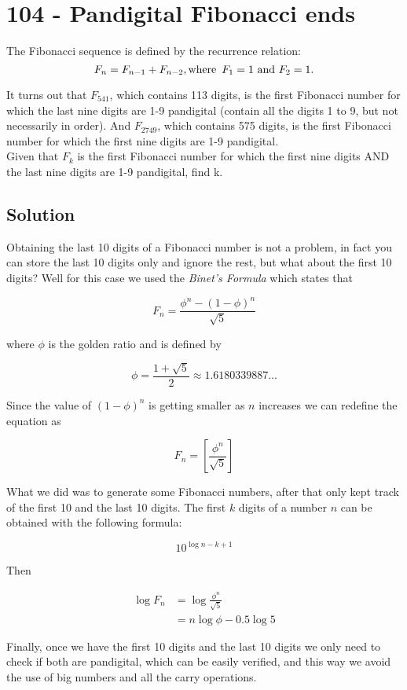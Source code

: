 \chapter*{104 - Pandigital Fibonacci ends}

 

The Fibonacci sequence is defined by the recurrence relation:\\

$$
F_n = F_{n-1} + F_{n-2}, \mbox{where} \hphantom{4} F_1 = 1 \mbox{ and } F_2 = 1.
$$

It turns out that $F_{541}$, which contains 113 digits, is the first Fibonacci number for which the last nine digits are 1-9 pandigital (contain all the digits 1 to 9, but not necessarily in order). And $F_{2749}$, which contains 575 digits, is the first Fibonacci number for which the first nine digits are 1-9 pandigital.\\

Given that $F_k$ is the first Fibonacci number for which the first nine digits AND the last nine digits are 1-9 pandigital, find k.

\section*{Solution}

Obtaining the last 10 digits of a Fibonacci number is not a problem, in fact you can store the last 10 digits only and ignore the rest, but what about the first 10 digits? Well for this case we used the \textit{Binet's Formula} which states that

$$
F_n = \frac{\phi^n - (1 - \phi)^{n}}{\sqrt{5}}
$$

where $\phi$ is the golden ratio and is defined by

$$
\phi = \frac{1 + \sqrt{5}}{2} \approx 1.6180339887 \ldots
$$

Since the value of $(1 - \phi)^n$ is getting smaller as $n$ increases we can redefine the equation as

$$
F_n = \left [ \frac{\phi^n}{\sqrt{5}} \right ]
$$

What we did was to generate some Fibonacci numbers, after that only kept track of the first 10 and the last 10 digits. The first $k$ digits of a number $n$ can be obtained with the following formula:

$$
10^{\log{n} - k + 1}
$$

Then

\begin{align*}
    \log{F_n} &= \log{\frac{\phi^n}{\sqrt{5}}} \\ 
    &= n \log{\phi} - 0.5\log{5}
\end{align*}

Finally, once we have the first 10 digits and the last 10 digits we only need to check if both are pandigital, which can be easily verified, and this way we avoid the use of big numbers and all the carry operations.